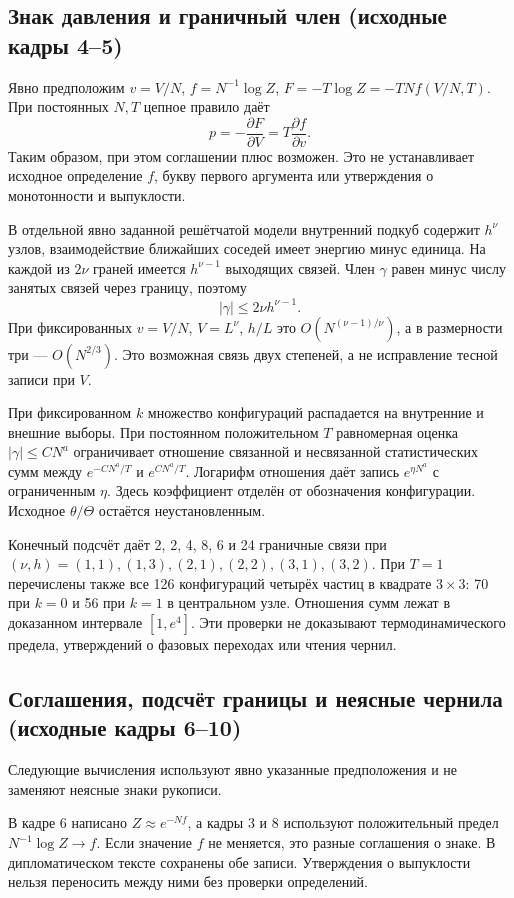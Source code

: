\documentclass[11pt]{article}
\begin{document}
\subsection*{Знак давления и граничный член (исходные кадры 4–5)}
Явно предположим \(v=V/N\), \(f=N^{-1}\log Z\), \(F=-T\log Z=-TNf(V/N,T)\). При постоянных \(N,T\) цепное правило даёт
\[p=-\frac{\partial F}{\partial V}=T\frac{\partial f}{\partial v}.\]
Таким образом, при этом соглашении плюс возможен. Это не устанавливает исходное определение \(f\), букву первого аргумента или утверждения о монотонности и выпуклости.

В отдельной явно заданной решётчатой модели внутренний подкуб содержит \(h^\nu\) узлов, взаимодействие ближайших соседей имеет энергию минус единица. На каждой из \(2\nu\) граней имеется \(h^{\nu-1}\) выходящих связей. Член \(\gamma\) равен минус числу занятых связей через границу, поэтому
\[|\gamma|\le 2\nu h^{\nu-1}.\]
При фиксированных \(v=V/N\), \(V=L^\nu\), \(h/L\) это \(O(N^{(\nu-1)/\nu})\), а в размерности три — \(O(N^{2/3})\). Это возможная связь двух степеней, а не исправление тесной записи при \(V\).

При фиксированном \(k\) множество конфигураций распадается на внутренние и внешние выборы. При постоянном положительном \(T\) равномерная оценка \(|\gamma|\le CN^a\) ограничивает отношение связанной и несвязанной статистических сумм между \(e^{-CN^a/T}\) и \(e^{CN^a/T}\). Логарифм отношения даёт запись \(e^{\eta N^a}\) с ограниченным \(\eta\). Здесь коэффициент отделён от обозначения конфигурации. Исходное \(\theta/\Theta\) остаётся неустановленным.

Конечный подсчёт даёт 2, 2, 4, 8, 6 и 24 граничные связи при \((\nu,h)=(1,1),(1,3),(2,1),(2,2),(3,1),(3,2)\). При \(T=1\) перечислены также все 126 конфигураций четырёх частиц в квадрате \(3\times3\): 70 при \(k=0\) и 56 при \(k=1\) в центральном узле. Отношения сумм лежат в доказанном интервале \([1,e^4]\). Эти проверки не доказывают термодинамического предела, утверждений о фазовых переходах или чтения чернил.

\subsection*{Соглашения, подсчёт границы и неясные чернила (исходные кадры 6–10)}
Следующие вычисления используют явно указанные предположения и не заменяют неясные знаки рукописи.

В кадре 6 написано \(Z\approx e^{-Nf}\), а кадры 3 и 8 используют положительный предел \(N^{-1}\log Z\to f\). Если значение \(f\) не меняется, это разные соглашения о знаке. В дипломатическом тексте сохранены обе записи. Утверждения о выпуклости нельзя переносить между ними без проверки определений.
\end{document}

